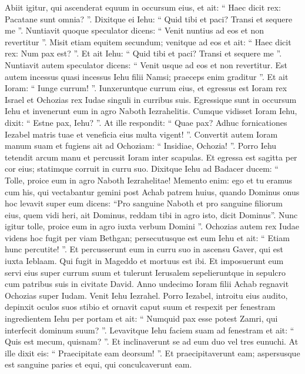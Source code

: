 \begin{biblechapter}
\begin{biblechapter}
\begin{biblechapter}
\begin{biblechapter}
\begin{biblechapter}
\begin{biblechapter}
\begin{biblechapter}
\begin{biblechapter}
\begin{biblechapter}
\verse Abiit igitur, qui ascenderat equum in occursum eius, et ait: “ Haec dicit rex: Pacatane sunt omnia? ”. Dixitque ei Iehu: “ Quid tibi et paci? Transi et sequere me ”. Nuntiavit quoque speculator dicens: “ Venit nuntius ad eos et non revertitur ”. 
\verse Misit etiam equitem secundum; venitque ad eos et ait: “ Haec dicit rex: Num pax est? ”. Et ait Iehu: “ Quid tibi et paci? Transi et sequere me ”. 
\verse Nuntiavit autem speculator dicens: “ Venit usque ad eos et non revertitur. Est autem incessus quasi incessus Iehu filii Namsi; praeceps enim graditur ”. 
\verse Et ait Ioram: “ Iunge currum! ”. Iunxeruntque currum eius, et egressus est Ioram rex Israel et Ochozias rex Iudae singuli in curribus suis. Egressique sunt in occursum Iehu et invenerunt eum in agro Naboth Iezrahelitis.
 \verse Cumque vidisset Ioram Iehu, dixit: “ Estne pax, Iehu? ”. At ille respondit: “ Quae pax? Adhuc fornicationes Iezabel matris tuae et veneficia eius multa vigent! ”. 
\verse Convertit autem Ioram manum suam et fugiens ait ad Ochoziam: “ Insidiae, Ochozia! ”. 
\verse Porro Iehu tetendit arcum manu et percussit Ioram inter scapulas. Et egressa est sagitta per cor eius; statimque corruit in curru suo. 
\verse Dixitque Iehu ad Badacer ducem: “ Tolle, proice eum in agro Naboth Iezrahelitae! Memento enim: ego et tu eramus cum his, qui vectabantur gemini post Achab patrem huius, quando Dominus onus hoc levavit super eum dicens: 
 \verse “Pro sanguine Naboth et pro sanguine filiorum eius, quem vidi heri, ait Dominus, reddam tibi in agro isto, dicit Dominus”. Nunc igitur tolle, proice eum in agro iuxta verbum Domini ”.
 \verse Ochozias autem rex Iudae videns hoc fugit per viam Bethgan; persecutusque est eum Iehu et ait: “ Etiam hunc percutite! ”. Et percusserunt eum in curru suo in ascensu Gaver, qui est iuxta Ieblaam. Qui fugit in Mageddo et mortuus est ibi. 
 \verse Et imposuerunt eum servi eius super currum suum et tulerunt Ierusalem sepelieruntque in sepulcro cum patribus suis in civitate David.
 \verse Anno undecimo Ioram filii Achab regnavit Ochozias super Iudam.
 \verse Venit Iehu Iezrahel. Porro Iezabel, introitu eius audito, depinxit oculos suos stibio et ornavit caput suum et respexit per fenestram \verse ingredientem Iehu per portam et ait: “ Numquid pax esse potest Zamri, qui interfecit dominum suum? ”.
 \verse Levavitque Iehu faciem suam ad fenestram et ait: “ Quis est mecum, quisnam? ”. Et inclinaverunt se ad eum duo vel tres eunuchi. 
\verse At ille dixit eis: “ Praecipitate eam deorsum! ”. Et praecipitaverunt eam; aspersusque est sanguine paries et equi, qui conculcaverunt eam. 

\end{biblechapter}
\end{biblechapter}
\end{biblechapter}
\end{biblechapter}
\end{biblechapter}
\end{biblechapter}
\end{biblechapter}
\end{biblechapter}
\end{biblechapter}
